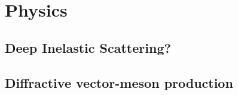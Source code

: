 \chapter{Physics}\label{cha:physics} %

\section{Deep Inelastic Scattering?}

\section{Diffractive vector-meson production}


